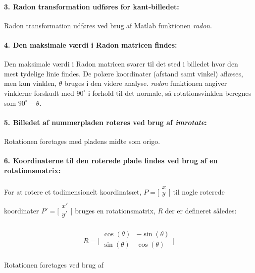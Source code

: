 \paragraph{3. Radon transformation udføres for kant-billedet:} Radon transformation udføres ved brug af Matlab funktionen \textit{radon}.

\paragraph{4. Den maksimale værdi i Radon matricen findes:} Den maksimale værdi i Radon matricen svarer til det sted i billedet hvor den mest tydelige linie findes. De polære koordinater (afstand samt vinkel) aflæses, men kun vinklen, $\theta$ bruges i den videre analyse. \textit{radon} funktionen angiver vinklerne forskudt med $90^{\circ}$ i forhold til det normale, så rotationsvinklen beregnes som $90^{\circ} - \theta$.

\paragraph{5. Billedet af nummerpladen roteres ved brug af \textit{imrotate}:} Rotationen foretages med pladens midte som origo.

\paragraph{6. Koordinaterne til den roterede plade findes ved brug af en rotationsmatrix:} For at rotere et todimensionelt koordinatsæt, $P=\biggl[\begin{array}{c} x\\ y\\ \end{array}\biggr]$ til nogle roterede koordinater $P'=\biggl[\begin{array}{c} x'\\ y'\\ \end{array}\biggr]$ bruges en rotationsmatrix, \textit{R} der er defineret således:

\begin{displaymath} 
R = 
\biggl[ \begin{array}{cc} 
\cos(\theta) & - \sin(\theta) \\
\sin(\theta) & \cos(\theta) \\
\end{array} \biggr] 
\end{displaymath}

Rotationen foretages ved brug af

